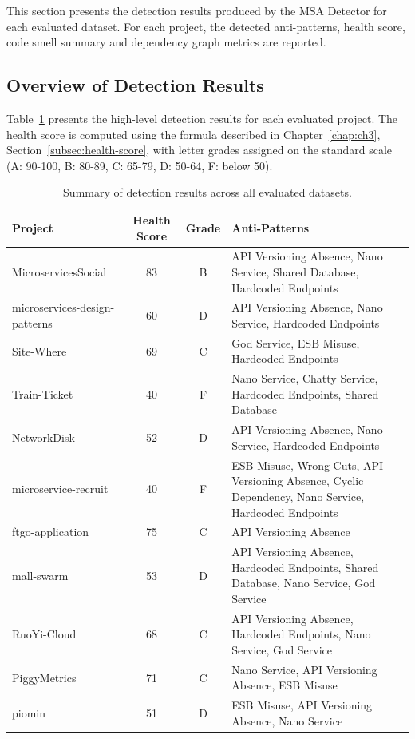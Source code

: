 \par This section presents the detection results produced by the MSA Detector for each evaluated dataset. For each project, the detected anti-patterns, health score, code smell summary and dependency graph metrics are reported.

\subsection{Overview of Detection Results}
\label{subsec:results-overview}

\par Table~\ref{tab:results-overview} presents the high-level detection results for each evaluated project. The health score is computed using the formula described in Chapter~\ref{chap:ch3}, Section~\ref{subsec:health-score}, with letter grades assigned on the standard scale (A: 90-100, B: 80-89, C: 65-79, D: 50-64, F: below 50).


\begin{table}[htbp]
    \centering
    \footnotesize
    \begin{tabularx}{\textwidth}{|l|c|c|X|}
        \hline
        \textbf{Project} & \textbf{Health Score} & \textbf{Grade} & \textbf{Anti-Patterns} \\
        \hline\hline
        MicroservicesSocial & 83 & B & API Versioning Absence, Nano Service, Shared Database, Hardcoded Endpoints \\
        \hline
        microservices-design-patterns & 60 & D & API Versioning Absence, Nano Service, Hardcoded Endpoints \\
        \hline
        Site-Where & 69 & C & God Service, ESB Misuse, Hardcoded Endpoints \\
        \hline
        Train-Ticket & 40 & F & Nano Service, Chatty Service, Hardcoded Endpoints, Shared Database \\
        \hline
        NetworkDisk & 52 & D & API Versioning Absence, Nano Service, Hardcoded Endpoints \\
        \hline
        microservice-recruit & 40 & F & ESB Misuse, Wrong Cuts, API Versioning Absence, Cyclic Dependency, Nano Service, Hardcoded Endpoints \\
        \hline
        ftgo-application & 75 & C & API Versioning Absence \\
        \hline
        mall-swarm & 53 & D & API Versioning Absence, Hardcoded Endpoints, Shared Database, Nano Service, God Service \\
        \hline
        RuoYi-Cloud & 68 & C & API Versioning Absence, Hardcoded Endpoints, Nano Service, God Service \\
        \hline
        PiggyMetrics & 71 & C & Nano Service, API Versioning Absence, ESB Misuse \\
        \hline
        piomin & 51 & D & ESB Misuse, API Versioning Absence, Nano Service \\
        \hline
    \end{tabularx}
    \caption{Summary of detection results across all evaluated datasets.}
    \label{tab:results-overview}
\end{table}

